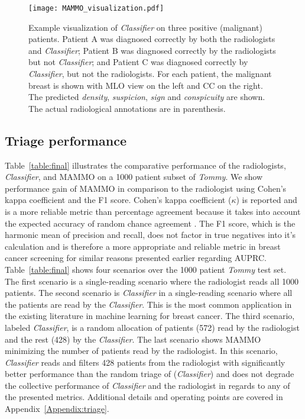 \documentclass[journal]{IEEEtran}
\begin{document}
\begin{figure*}[!htbp]
\centering
  \texttt{[image: MAMMO\_visualization.pdf]}
  \caption{Example visualization of \textit{Classifier} on three positive (malignant) patients.  Patient A was diagnosed correctly by both the radiologists and \textit{Classifier}; Patient B was diagnosed correctly by the radiologists but not \textit{Classifier}; and Patient C was diagnosed correctly by \textit{Classifier}, but not the radiologists. For each patient, the malignant breast is shown with MLO view on the left and CC on the right.  The predicted \textit{density}, \textit{suspicion}, \textit{sign} and \textit{conspicuity} are shown.  The actual radiological annotations are in parenthesis. }
  \label{fig:viz}
\end{figure*}

\subsection{Triage performance}


Table~\ref{table:final} illustrates the comparative performance of the radiologists, \textit{Classifier}, and MAMMO on a 1000 patient subset of \textit{Tommy}.  We show performance gain of MAMMO in comparison to the radiologist using Cohen's kappa coefficient and the F1 score.
Cohen's kappa coefficient ($\kappa$) is reported and is a more reliable metric than percentage agreement because it takes into account the expected accuracy of random chance agreement \cite{cohen-kappa}.  
The F1 score, which is the harmonic mean of precision and recall, does not factor in true negatives into it's calculation and is therefore a more appropriate and reliable metric in breast cancer screening for similar reasons presented earlier regarding AUPRC.  
Table~\ref{table:final} shows four scenarios over the 1000 patient \textit{Tommy} test set.
The first scenario is a single-reading scenario where the radiologist reads all 1000 patients.  The second scenario is \textit{Classifier} in a single-reading scenario where all the patients are read by the \textit{Classifier}.  This is the most common application in the existing literature in machine learning for breast cancer. The third scenario, labeled  \textit{Classifier\textsuperscript{\textregistered}}, is a random allocation of patients (572) read by the radiologist and the rest (428) by the \textit{Classifier}. The last scenario shows MAMMO minimizing the number of patients read by the radiologist. In this scenario, \textit{Classifier} reads and filters 428 patients from the radiologist with significantly better performance than the random triage of  (\textit{Classifier\textsuperscript{\textregistered}}) and does not degrade the collective performance of \textit{Classifier} and the radiologist in regards to any of the presented metrics. Additional details and operating points are covered in Appendix~\ref{Appendix:triage}. 
\end{document}
